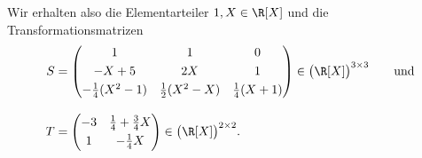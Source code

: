 \begin{thBeisp}
    \medskip
    Wir erhalten also die Elementarteiler $1,X\in\R[X]$ und die
    Transformationsmatrizen
    \begin{align*}
        S &= \Matrix{
        1 & 1 & 0       \\[3pt]
        -X+5 & 2X & 1   \\[3pt]
        -\frac{1}{4} (X^2-1) & \frac{1}{2} (X^2-X) & \frac{1}{4} (X+1)   }
        \in \bigl(\R[X]\bigr)^{3\times3}
        \qquad\text{und}
        \\[3mm]
        T &= \Matrix{
            -3 & \frac{1}{4}+\frac{3}{4}X   \\[3pt]
            1  & -\frac{1}{4}X                  }
        \in \bigl(\R[X]\bigr)^{2\times2}
    .
    \end{align*}
        
    
\end{thBeisp}














